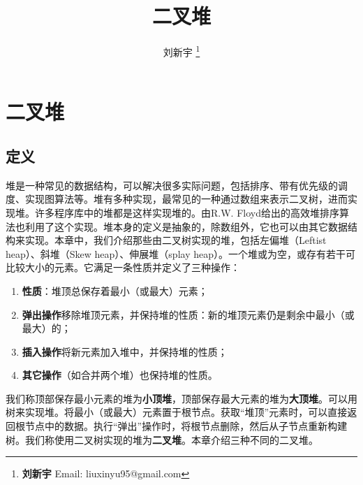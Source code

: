 \documentclass[b5paper]{ctexart}
\begin{document}
\title{二叉堆}

\author{刘新宇
\thanks{{\bfseries 刘新宇 } \newline
  Email: liuxinyu95@gmail.com \newline}
  }

\maketitle
\fi


\ifx\wholebook\relax
\chapter{二叉堆}
\fi

\section{定义}
\label{introduction} 

堆是一种常见的数据结构，可以解决很多实际问题，包括排序、带有优先级的调度、实现图算法等\cite{wiki-heap}。堆有多种实现，最常见的一种通过数组来表示二叉树\cite{CLRS}，进而实现堆。许多程序库中的堆都是这样实现堆的。由R.W. Floyd给出的高效堆排序算法也利用了这个实现\cite{wiki-heapsort}\cite{rosetta-heapsort}。堆本身的定义是抽象的，除数组外，它也可以由其它数据结构来实现。本章中，我们介绍那些由二叉树实现的堆，包括左偏堆（Leftist heap）、斜堆（Skew heap）、伸展堆（splay heap）\cite{okasaki-book}。一个堆或为空，或存有若干可比较大小的元素。它满足一条性质并定义了三种操作：

\begin{enumerate}
\item \textbf{性质}：堆顶总保存着最小（或最大）元素；
\item \textbf{弹出操作}移除堆顶元素，并保持堆的性质：新的堆顶元素仍是剩余中最小（或最大）的；
\item \textbf{插入操作}将新元素加入堆中，并保持堆的性质；
\item \textbf{其它操作}（如合并两个堆）也保持堆的性质。
\end{enumerate}

我们称顶部保存最小元素的堆为\textbf{小顶堆}，顶部保存最大元素的堆为\textbf{大顶堆}。可以用树来实现堆。将最小（或最大）元素置于根节点。获取“堆顶”元素时，可以直接返回根节点中的数据。执行“弹出”操作时，将根节点删除，然后从子节点重新构建树。我们称使用二叉树实现的堆为\textbf{二叉堆}。本章介绍三种不同的二叉堆。
\end{document}
